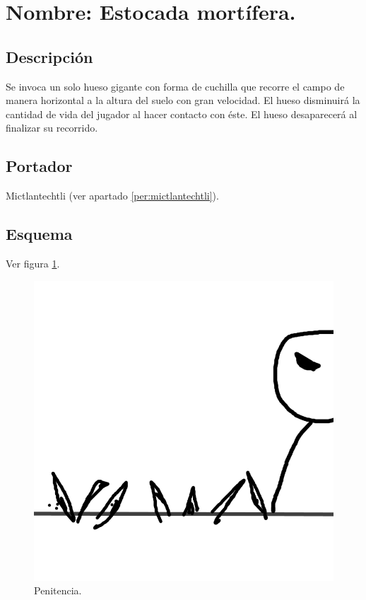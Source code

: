 \section{Nombre: Estocada mortífera.}\label{hab.estMor}
\subsection{Descripción}
Se invoca un solo hueso gigante con forma de cuchilla que recorre el campo de manera horizontal a la altura del suelo con gran velocidad. El hueso disminuirá la cantidad de vida del jugador al hacer contacto con éste. El hueso desaparecerá al finalizar su recorrido.
\subsection{Portador}
Mictlantechtli (ver apartado \ref{per:mictlantechtli}).	
\subsection{Esquema}
			Ver figura \ref{fig:penitencia}.
			\begin{figure}
				\centering
				\includegraphics[height=0.2 \textheight]{Imagenes/penitencia}
				\caption{Penitencia.}
				\label{fig:penitencia}
			\end{figure}			
			